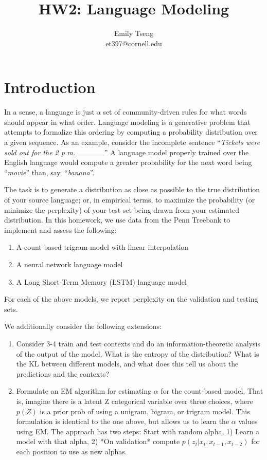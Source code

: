 \documentclass[11pt]{article}
\title{HW2: Language Modeling}
\author{Emily Tseng \\ et397@cornell.edu}
\begin{document}
\maketitle{}
\section{Introduction}

In a sense, a language is just a set of community-driven rules for what words should appear in what order. Language modeling is a generative problem that attempts to formalize this ordering by computing a probability distribution over a given sequence. As an example, consider the incomplete sentence ``\textit{Tickets were sold out for the 2 p.m. \_\_\_\_\_}'' A language model properly trained over the English language would compute a greater probability for the next word being ``\textit{movie}'' than, say, ``\textit{banana}''. 

The task is to generate a distribution as close as possible to the true distribution of your source language; or, in empirical terms, to maximize the probability (or minimize the perplexity) of your test set being drawn from your estimated distribution. In this homework, we use data from the Penn Treebank \citep{marcus-etal-1993-building} to implement and assess the following:

\begin{enumerate}
  \item A count-based trigram model with linear interpolation
  \item A neural network language model \citep{bengio2003neural}
  \item A Long Short-Term Memory (LSTM) language model \citep{zaremba2014recurrent}
\end{enumerate}

For each of the above models, we report perplexity on the validation and testing sets. 

We additionally consider the following extensions:

\begin{enumerate}
  \item Consider 3-4 train and test contexts and do an information-theoretic analysis of the output of the model. What is the entropy of the distribution? What is the KL between different models, and what does this tell us about the predictions and the contexts?
  \item Formulate an EM algorithm for estimating $\alpha$ for the count-based model. That is, imagine there is a latent Z categorical variable over three choices, where $p(Z)$ is a prior prob of using a unigram, bigram, or trigram model. This formulation is identical to the one above, but allows us to learn the $\alpha$ values using EM. The approach has two steps: Start with random alpha, 1) Learn a model with that alpha, 2) *On validation* compute $p(z_t | x_t, x_{t-1}, x_{t-2})$ for each position to use as new alphas. 
\end{enumerate}
\end{document}
